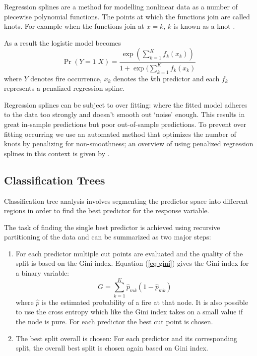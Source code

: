 \documentclass[11pt,a4paper]{article}
\begin{document}
Regression splines are a method for modelling nonlinear data as a number of piecewise  polynomial functions. The points at which the functions join are called knots. For example when the functions join at $x=k$, $k$ is known as a knot \citep{ruppert03}.

As a result the logistic model becomes
\begin{equation}
  \label{eq logits}
  \Pr(Y=1|X)=\frac{\exp(\sum_{k=1}^K f_k(x_k))}{1+\exp(\sum_{k=1}^K f_k(x_k)}
\end{equation}
where $Y$ denotes fire occurrence, $x_k$ denotes the $k$th predictor and each $f_k$ represents a penalized regression spline.

Regression splines can be subject to over fitting: where the fitted model adheres to the data too strongly and doesn't smooth out `noise' enough. This results in great in-sample predictions but poor out-of-sample predictions. To prevent over fitting occurring we use an automated method that optimizes the number of knots by penalizing for non-smoothness; an overview of using penalized regression splines in this context is given by \citet{wood02}.

\subsection{Classification Trees}

Classification tree analysis involves segmenting the predictor space into different regions in order to find the best predictor for the response variable.

The task of finding the single best predictor is achieved using recursive partitioning of the data and can be summarized as two major steps:
\begin{enumerate}
  \item For each predictor multiple cut points are evaluated and the quality of the split is based on the Gini index. Equation (\ref{eq gini}) gives the Gini index for a binary variable:
  \begin{equation}
          \label{eq gini}
          G=\sum_{k=1}^{K} \hat{p}_{mk} (1-\hat{p}_{mk})
  \end{equation}
  where $\hat{p}$ is the estimated probability of a fire at that node. It is also possible to use the cross entropy \citep{james13} which like the Gini index takes on a small value if the node is pure. For each predictor the best cut point is chosen.
  \item The best split overall is chosen:  For each predictor and its corresponding split, the overall best split is chosen again based on Gini index.
\end{enumerate}
\end{document}
